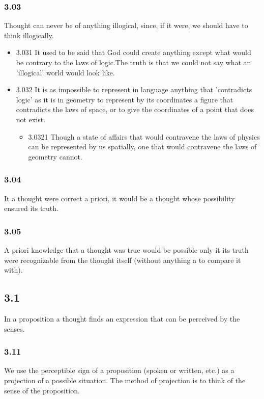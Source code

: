 \documentclass[11pt]{article}
\begin{document}
\subsubsection*{3.03}
\label{sec:orge3452e0}
Thought can never be of anything illogical, since, if it were, we
should have to think illogically.
\begin{itemize}
\item 3.031
\label{sec:org1e2f59c}
It used to be said that God could create anything except what would
be contrary to the laws of logic.The truth is that we could not say what an
'illogical' world would look like.
\item 3.032
\label{sec:orgb0d4cc7}
It is as impossible to represent in language anything that
'contradicts logic' as it is in geometry to represent by its coordinates a
figure that contradicts the laws of space, or to give the coordinates of a
point that does not exist.
\begin{itemize}
\item 3.0321
\label{sec:orgf70a9d1}
Though a state of affairs that would contravene the laws of physics
can be represented by us spatially, one that would contravene the laws of
geometry cannot.
\end{itemize}
\end{itemize}
\subsubsection*{3.04}
\label{sec:orgd37cfb2}
It a thought were correct a priori, it would be a thought whose
possibility ensured its truth.
\subsubsection*{3.05}
\label{sec:org9ffe1cf}
A priori knowledge that a thought was true would be possible only it
its truth were recognizable from the thought itself (without anything a to
compare it with).
\subsection*{3.1}
\label{sec:orgcdd538b}
In a proposition a thought finds an expression that can be perceived by
the senses.
\subsubsection*{3.11}
\label{sec:org740ec55}
We use the perceptible sign of a proposition (spoken or written, etc.)
as a projection of a possible situation. The method of projection is to
think of the sense of the proposition.
\end{document}

